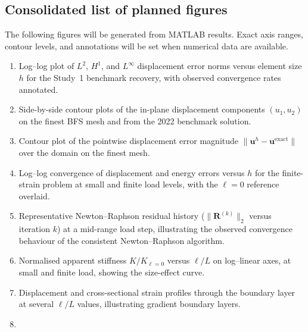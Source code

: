 \documentclass[11pt]{article}
\begin{document}
\subsection{Consolidated list of planned figures}
\label{ssec:s9_figures}

The following figures will be generated from MATLAB results.
Exact axis ranges, contour levels, and annotations will be
set when numerical data are available.

\begin{enumerate}
  \item[\textbf{Fig.\ref{fig:s9_conv_bench}.}]
    Log--log plot of $L^2$, $H^1$, and $L^\infty$ displacement
    error norms versus element size $h$ for the Study~1
    benchmark recovery, with observed convergence rates
    annotated.
  \item[\textbf{Fig.\ref{fig:s9_disp_field_bench}.}]
    Side-by-side contour plots of the in-plane displacement
    components $(u_1,u_2)$ on the finest BFS mesh and from
    the 2022 benchmark solution.
  \item[\textbf{Fig.\ref{fig:s9_err_field_bench}.}]
    Contour plot of the pointwise displacement error
    magnitude $\|\mathbf{u}^{h}-\mathbf{u}^{\mathrm{exact}}\|$
    over the domain on the finest mesh.
  \item[\textbf{Fig.\ref{fig:s9_conv_nl_loglog}.}]
    Log--log convergence of displacement and energy errors
    versus $h$ for the finite-strain problem at small and
    finite load levels, with the $\ell=0$ reference overlaid.
  \item[\textbf{Fig.\ref{fig:s9_newton_hist}.}]
    Representative Newton--Raphson residual history
    ($\|\mathbf{R}^{(k)}\|_2$ versus iteration $k$) at a
    mid-range load step, illustrating the observed
    convergence behaviour of the consistent Newton--Raphson
    algorithm.
  \item[\textbf{Fig.\ref{fig:s9_sizeeffect_curve}.}]
    Normalised apparent stiffness $K/K_{\ell=0}$ versus
    $\ell/L$ on log--linear axes, at small and finite load,
    showing the size-effect curve.
  \item[\textbf{Fig.\ref{fig:s9_bl_profiles}.}]
    Displacement and cross-sectional strain profiles through
    the boundary layer at several $\ell/L$ values,
    illustrating gradient boundary layers.
  \item[\textbf{Fig.\ref{fig:s9_l_field}.}]

\end{enumerate}
\end{document}
